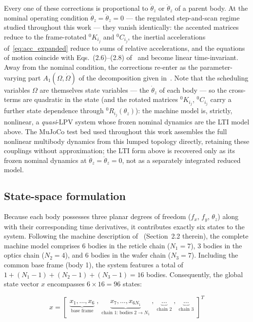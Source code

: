Every one of these corrections is proportional to $\dot{\theta}_z$ or $\ddot{\theta}_z$ of a parent body. At the nominal operating condition $\dot{\theta}_z = \ddot{\theta}_z = 0$ --- the regulated step-and-scan regime studied throughout this work --- they vanish identically: the accented matrices reduce to the frame-rotated ${}^0K_{i_j}$ and ${}^0C_{i_j}$, the inertial accelerations of~\eqref{eq:acc_expanded} reduce to sums of relative accelerations, and the equations of motion coincide with Eqs.~(2.6)--(2.8) of~\cite{Al-Rawashdeh2022_Caracterization} and become linear time-invariant. Away from the nominal condition, the corrections re-enter as the parameter-varying part $A_1(\Omega,\dot{\Omega})$ of the decomposition given in~\cite{Al-Rawashdeh2022_Caracterization}. Note that the scheduling variables $\Omega$ are themselves state variables --- the $\dot{\theta}_z$ of each body --- so the cross-terms are quadratic in the state (and the rotated matrices ${}^0K_{i_j}$, ${}^0C_{i_j}$ carry a further state dependence through ${}^0R_{i_j}(\theta_z)$): the machine model is, strictly, nonlinear, a \emph{quasi}-LPV system whose frozen nominal dynamics are the LTI model above. The MuJoCo test bed used throughout this work assembles the full nonlinear multibody dynamics from this lumped topology directly, retaining these couplings without approximation; the LTI form above is recovered only as its frozen nominal dynamics at $\dot{\theta}_z = \ddot{\theta}_z = 0$, not as a separately integrated reduced model.

\subsection{State-space formulation}

Because each body possesses three planar degrees of freedom ($f_x$, $f_y$, $\theta_z$) along with their corresponding time derivatives, it contributes exactly six states to the system. Following the machine description of~\cite{Al-Rawashdeh2022_Caracterization} (Section~2.2 therein), the complete machine model comprises 6 bodies in the reticle chain ($N_1 = 7$), 3 bodies in the optics chain ($N_2 = 4$), and 6 bodies in the wafer chain ($N_3 = 7$). Including the common base frame (body 1), the system features a total of $1 + (N_1-1) + (N_2-1) + (N_3-1) = 16$ bodies. Consequently, the global state vector $x$ encompasses $6 \times 16 = 96$ states:

\begin{equation}
    x =
    \begin{bmatrix}
        \underbrace{x_1, \ldots, x_6}_{\text{base frame}} \;,\;
        \underbrace{x_7, \ldots, x_{6N_1}}_{\text{chain 1: bodies } 2 \to N_1} \;,\;
        \underbrace{\ldots}_{\text{chain 2}} \;,\;
        \underbrace{\ldots}_{\text{chain 3}}
    \end{bmatrix}^T
\end{equation}

